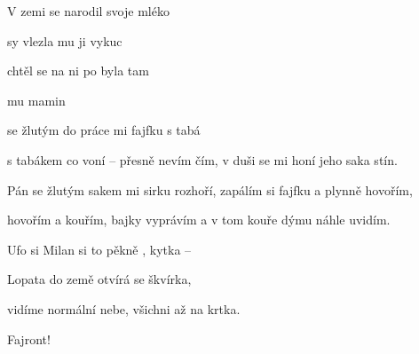 

\zs
V zemi se narodil 
 svoje mléko 

sy vlezla mu 
 ji vykuc 

chtěl se na {ni} po
 byla tam 

 mu mamin

\ks
\zs

  se žlutým 
do práce mi  fajfku s tabá

s tabákem co voní -- přesně nevím čím,
v duši se mi honí jeho saka stín.

Pán se žlutým sakem mi sirku rozhoří,
zapálím si fajfku a plynně hovořím,

hovořím a kouřím, bajky vyprávím
a v tom kouře dýmu náhle uvidím.

\ks
\zs

Ufo si Milan si
to pěkně , kytka -- 

Lopata do země 
otvírá se škvírka,

vidíme normální nebe,
všichni až na krtka.

Fajront!
\ks

\kp





